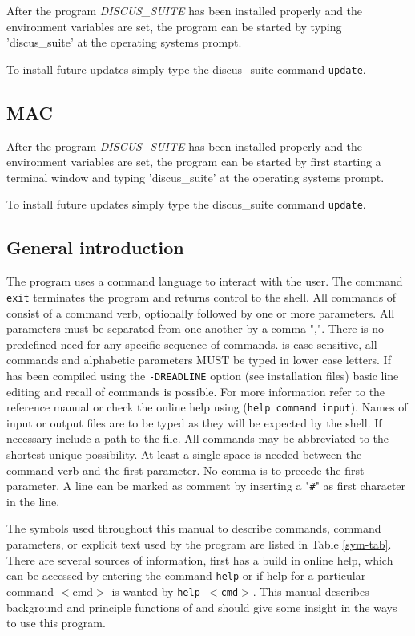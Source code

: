 After the program {\it DISCUS\_SUITE} has been installed properly and the
environment variables are set, the program can be started by typing
'discus\_suite' at the operating systems prompt.

To install future updates simply type the discus\_suite command {\tt update}.

\subsection{MAC}

After the program {\it DISCUS\_SUITE} has been installed properly and the
environment variables are set, the program can be started by first 
starting a terminal window and typing
'discus\_suite' at the operating systems prompt.

To install future updates simply type the discus\_suite command {\tt update}.

\subsection{General introduction}

The program uses a command language to interact with the user.  The
command {\tt exit} terminates the program and returns control to the
shell.  All commands of \Suite consist of a command verb,
optionally followed by one or more parameters.  All parameters must
be separated from one another by a comma ",".  There is no
predefined need for any specific sequence of commands.  \Suite     
is case sensitive, all commands and alphabetic parameters MUST be
typed in lower case letters.  If \Suite has been compiled
using the {\tt -DREADLINE} option (see installation files) basic
line editing and recall of commands is possible.  For more
information refer to the reference manual or check the online help
using ({\tt help command input}).  Names of input or output files
are to be typed as they will be expected by the shell.  If necessary
include a path to the file.  All commands may be abbreviated to the
shortest unique possibility. At least a single space is needed
between the command verb and the first parameter.  No comma is to
precede the first parameter. A line can be marked as comment by
inserting a "{\tt \#}" as first character in the line.\par

The symbols used throughout this manual to describe commands,
command parameters, or explicit text used by the program \Suite     
are listed in Table \ref{sym-tab}. There are several sources
of information, first \Suite  has a build in online help, which
can be accessed by entering the command {\tt help} or if help for a
particular command $<$cmd$>$ is wanted by {\tt help $<$cmd$>$}. This
manual describes background and principle functions of \Suite
and should give some insight in the ways to use this program. \par

